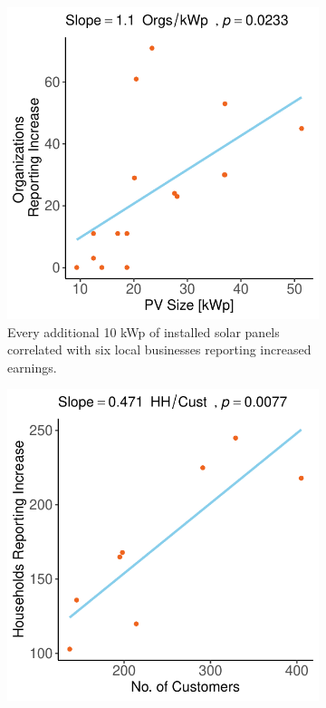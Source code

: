 \begin{figure}[t]
	\centering
	\begin{subfigure}[t]{0.48\textwidth}
		\centering
		\includegraphics[width=\textwidth]{images/earnings_change_regression_community.pdf}
		\caption{Every additional 10 kWp of installed solar panels correlated with six local businesses reporting increased earnings.}
		\label{fig:earnings_change}
	\end{subfigure}
	\hfill
	\begin{subfigure}[t]{0.48\textwidth}
		\centering
		\includegraphics[width=\textwidth]{images/kenya_avg_household_income_regression_community.pdf}

\end{subfigure}
\end{figure}
